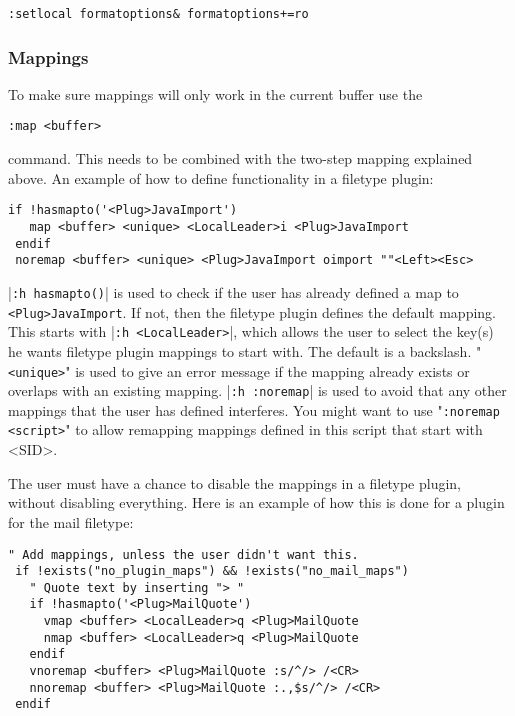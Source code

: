\begin{Verbatim}[samepage=true]
 :setlocal formatoptions& formatoptions+=ro
\end{Verbatim}

\subsubsection{Mappings}
To make sure mappings will only work in the current buffer use the

\begin{Verbatim}[samepage=true]
 :map <buffer>
\end{Verbatim}

command.
This needs to be combined with the two-step mapping explained above.
An example of how to define functionality in a filetype plugin:

\begin{Verbatim}[samepage=true]
 if !hasmapto('<Plug>JavaImport')
   map <buffer> <unique> <LocalLeader>i <Plug>JavaImport
 endif
 noremap <buffer> <unique> <Plug>JavaImport oimport ""<Left><Esc>
\end{Verbatim}

|\texttt{:h hasmapto()}| is used to check if the user has already defined a map to \texttt{<Plug>JavaImport}.
If not, then the filetype plugin defines the default mapping.
This starts with |\texttt{:h <LocalLeader>}|, which allows the user to select the key(s) he wants filetype plugin mappings to start with.
The default is a backslash.
"\texttt{<unique>}" is used to give an error message if the mapping already exists or overlaps with an existing mapping.
|\texttt{:h :noremap}| is used to avoid that any other mappings that the user has defined interferes.
You might want to use "\texttt{:noremap <script>}" to allow remapping mappings defined in this script that start with <SID>.

The user must have a chance to disable the mappings in a filetype plugin, without disabling everything.
Here is an example of how this is done for a plugin for the mail filetype:

\begin{Verbatim}[samepage=true]
 " Add mappings, unless the user didn't want this.
 if !exists("no_plugin_maps") && !exists("no_mail_maps")
   " Quote text by inserting "> "
   if !hasmapto('<Plug>MailQuote')
     vmap <buffer> <LocalLeader>q <Plug>MailQuote
     nmap <buffer> <LocalLeader>q <Plug>MailQuote
   endif
   vnoremap <buffer> <Plug>MailQuote :s/^/> /<CR>
   nnoremap <buffer> <Plug>MailQuote :.,$s/^/> /<CR>
 endif
\end{Verbatim}

